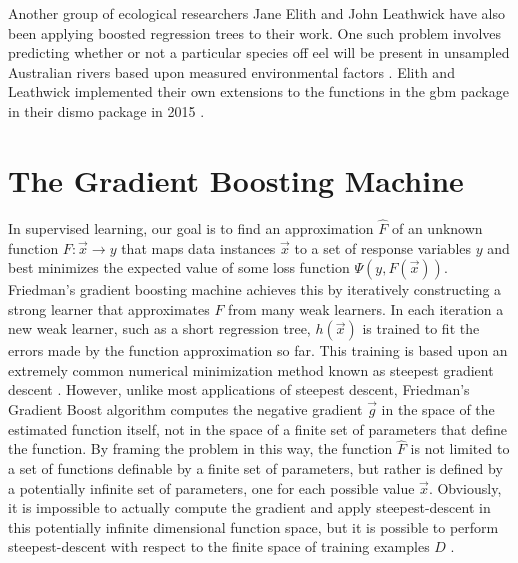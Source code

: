 \documentclass[9pt, conference]{IEEEtran}
\begin{document}
Another group of ecological researchers Jane Elith and John Leathwick have also been applying boosted regression trees to their work. One such problem involves predicting whether or not a particular species off eel will be present in unsampled Australian rivers based upon measured environmental factors \cite{ecological}.  Elith and Leathwick implemented their own extensions to the functions in the gbm package in their dismo package in 2015 \cite{elith2015boosted}. 


\section{The Gradient Boosting Machine}
\label{sec:GradientBoostingMachine}
In supervised learning, our goal is to find an approximation \(\hat{F}\) of an unknown function \(F: \vec{x} \rightarrow y\) that maps data instances \(\vec{x}\) to a set of response variables \(y\) and best minimizes the expected value of some loss function \( \Psi(y, F(\vec{x})) \). 
Friedman's gradient boosting machine achieves this by iteratively constructing a strong learner that approximates \(F\) from many weak learners. In each iteration a new weak learner, such as a short regression tree, \(h(\vec{x})\) is trained to fit the errors made by the function approximation so far. This training is based upon an extremely common numerical minimization method known as steepest gradient descent \cite{2012ridgeway} \cite{2001Friedman} . 
However, unlike most applications of steepest descent, Friedman's Gradient Boost algorithm computes the negative gradient \(\vec{g}\) in the space of the estimated function itself, not in the space of a finite set of parameters that define the function. By framing the problem in this way, the function \(\hat{F}\) is not limited to a set of functions definable by a finite set of parameters, but rather is defined by a potentially infinite set of parameters, one for each possible value \(\vec{x}\). Obviously, it is impossible to actually compute the gradient and apply steepest-descent in this potentially infinite dimensional function space, but it is possible to perform steepest-descent with respect to the finite space of training examples \(D\) \cite{2012ridgeway} \cite{2001Friedman}. 
\end{document}
